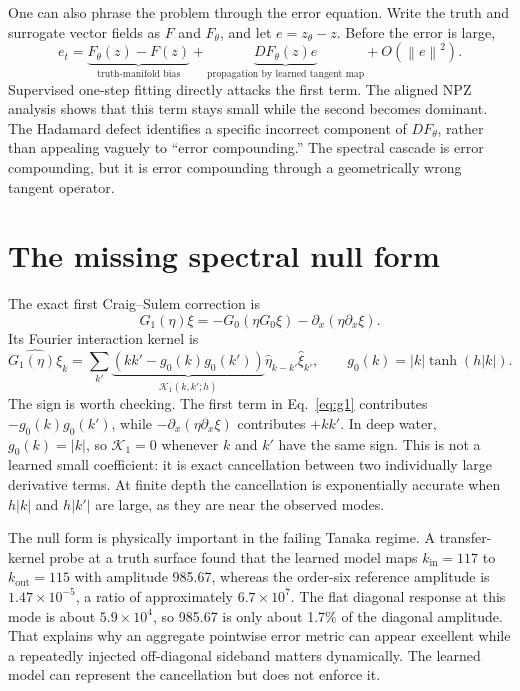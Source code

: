 \documentclass[11pt]{article}
\newcommand{\norm}[1]{\left\lVert #1\right\rVert}
\begin{document}
One can also phrase the problem through the error equation.  Write the truth
and surrogate vector fields as \(F\) and \(F_\theta\), and let
\(e=z_\theta-z\).  Before the error is large,
\begin{equation}
 e_t
 =\underbrace{F_\theta(z)-F(z)}_{\text{truth-manifold bias}}
 +\underbrace{DF_\theta(z)e}_{\text{propagation by learned tangent map}}
 +O(\norm{e}^2).
 \label{eq:error-linearization}
\end{equation}
Supervised one-step fitting directly attacks the first term.  The aligned NPZ
analysis shows that this term stays small while the second becomes dominant.
The Hadamard defect identifies a specific incorrect component of
\(DF_\theta\), rather than appealing vaguely to ``error compounding.''  The
spectral cascade is error compounding, but it is error compounding through a
geometrically wrong tangent operator.

\section{The missing spectral null form}

The exact first Craig--Sulem correction is
\begin{equation}
 G_1(\eta)\xi
 =-G_0\!\left(\eta G_0\xi\right)
  -\partial_x\!\left(\eta\partial_x\xi\right).
 \label{eq:g1}
\end{equation}
Its Fourier interaction kernel is
\begin{equation}
 \widehat{G_1(\eta)\xi}_k
 =\sum_{k'}
 \underbrace{\left(kk'-g_0(k)g_0(k')\right)}_{\mathcal K_1(k,k';h)}
 \widehat{\eta}_{k-k'}\widehat{\xi}_{k'},
 \qquad g_0(k)=|k|\tanh(h|k|).
 \label{eq:g1-kernel}
\end{equation}
The sign is worth checking.  The first term in Eq.~\eqref{eq:g1} contributes
\(-g_0(k)g_0(k')\), while
\(-\partial_x(\eta\partial_x\xi)\) contributes \(+kk'\).  In deep water,
\(g_0(k)=|k|\), so \(\mathcal K_1=0\) whenever \(k\) and \(k'\) have the same
sign.  This is not a learned small coefficient: it is exact cancellation
between two individually large derivative terms.  At finite depth the
cancellation is exponentially accurate when \(h|k|\) and \(h|k'|\) are large,
as they are near the observed modes.

The null form is physically important in the failing Tanaka regime.  A transfer-kernel probe
at a truth surface found that the learned model maps \(k_{\mathrm{in}}=117\)
to \(k_{\mathrm{out}}=115\) with amplitude 985.67, whereas the order-six
reference amplitude is \(1.47\times10^{-5}\), a ratio of approximately
\(6.7\times10^7\).  The flat diagonal response at this mode is about
\(5.9\times10^4\), so 985.67 is only about 1.7\% of the diagonal amplitude.
That explains why an aggregate pointwise error metric can appear excellent
while a repeatedly injected off-diagonal sideband matters dynamically.  The
learned model can represent the cancellation but does not enforce it.
\end{document}
